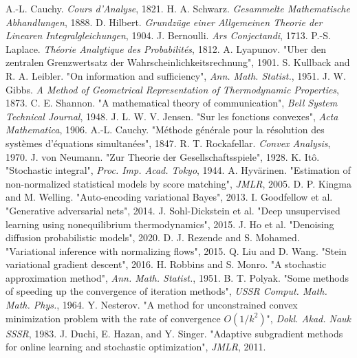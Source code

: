 \documentclass[11pt]{book}
\begin{document}

\begin{thebibliography}{99}
 A.-L. Cauchy. \emph{Cours d'Analyse}, 1821.
 H. A. Schwarz. \emph{Gesammelte Mathematische Abhandlungen}, 1888.
 D. Hilbert. \emph{Grundzüge einer Allgemeinen Theorie der Linearen Integralgleichungen}, 1904.
 J. Bernoulli. \emph{Ars Conjectandi}, 1713.
 P.-S. Laplace. \emph{Théorie Analytique des Probabilités}, 1812.
 A. Lyapunov. "Uber den zentralen Grenzwertsatz der Wahrscheinlichkeitsrechnung", 1901.
 S. Kullback and R. A. Leibler. "On information and sufficiency", \emph{Ann. Math. Statist.}, 1951.
 J. W. Gibbs. \emph{A Method of Geometrical Representation of Thermodynamic Properties}, 1873.
 C. E. Shannon. "A mathematical theory of communication", \emph{Bell System Technical Journal}, 1948.
 J. L. W. V. Jensen. "Sur les fonctions convexes", \emph{Acta Mathematica}, 1906.
 A.-L. Cauchy. "Méthode générale pour la résolution des systèmes d'équations simultanées", 1847.
 R. T. Rockafellar. \emph{Convex Analysis}, 1970.
 J. von Neumann. "Zur Theorie der Gesellschaftsspiele", 1928.
 K. Itô. "Stochastic integral", \emph{Proc. Imp. Acad. Tokyo}, 1944.
 A. Hyvärinen. "Estimation of non-normalized statistical models by score matching", \emph{JMLR}, 2005.
 D. P. Kingma and M. Welling. "Auto-encoding variational Bayes", 2013.
 I. Goodfellow et al. "Generative adversarial nets", 2014.
 J. Sohl-Dickstein et al. "Deep unsupervised learning using nonequilibrium thermodynamics", 2015.
 J. Ho et al. "Denoising diffusion probabilistic models", 2020.
 D. J. Rezende and S. Mohamed. "Variational inference with normalizing flows", 2015.
 Q. Liu and D. Wang. "Stein variational gradient descent", 2016.
 H. Robbins and S. Monro. "A stochastic approximation method", \emph{Ann. Math. Statist.}, 1951.
 B. T. Polyak. "Some methods of speeding up the convergence of iteration methods", \emph{USSR Comput. Math. Math. Phys.}, 1964.
 Y. Nesterov. "A method for unconstrained convex minimization problem with the rate of convergence $O(1/k^2)$", \emph{Dokl. Akad. Nauk SSSR}, 1983.
 J. Duchi, E. Hazan, and Y. Singer. "Adaptive subgradient methods for online learning and stochastic optimization", \emph{JMLR}, 2011.

\end{thebibliography}
\end{document}
